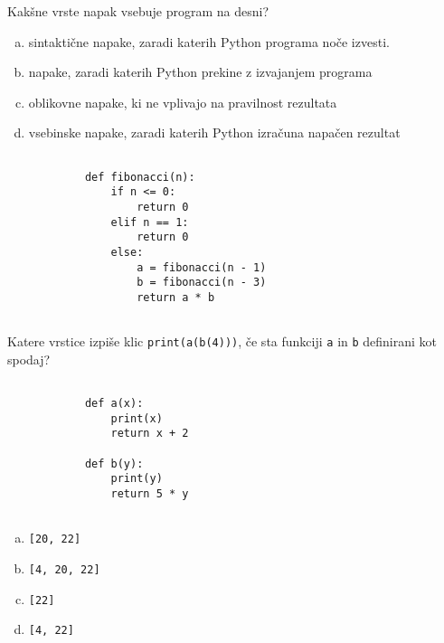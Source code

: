 \documentclass[arhiv, 10pt]{../izpit}
\newcommand{\inlinepy}[1]{\texttt{#1}}
\begin{document}
        \naloga*
        \begin{multicols}{2}
        \noindent
        Kakšne vrste napak vsebuje program na desni?

        \begin{enumerate}[(a)]
\item sintaktične napake, zaradi katerih Python programa noče izvesti.
\item napake, zaradi katerih Python prekine z izvajanjem programa
\item oblikovne napake, ki ne vplivajo na pravilnost rezultata
\item vsebinske napake, zaradi katerih Python izračuna napačen rezultat
\end{enumerate}

        \columnbreak

        \begin{verbatim}
        
            def fibonacci(n):
                if n <= 0:
                    return 0
                elif n == 1:
                    return 0
                else:
                    a = fibonacci(n - 1)
                    b = fibonacci(n - 3)
                    return a * b
            
        \end{verbatim}

        \end{multicols}

    
        \naloga*
        Katere vrstice izpiše klic \inlinepy{print(a(b(4)))}, če sta funkciji \inlinepy{a} in \inlinepy{b} definirani kot spodaj?

        \begin{multicols}{2}
        \begin{verbatim}
        
            def a(x):
                print(x)
                return x + 2

            def b(y):
                print(y)
                return 5 * y
        
        \end{verbatim}

        \begin{enumerate}[(a)]
\item \inlinepy{[20, 22]}
\item \inlinepy{[4, 20, 22]}
\item \inlinepy{[22]}
\item \inlinepy{[4, 22]}
\end{enumerate}

        \end{multicols}
    
\end{document}
